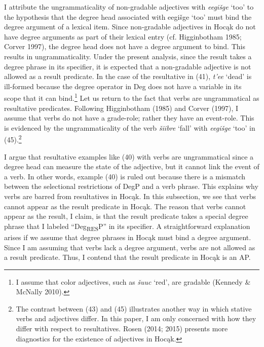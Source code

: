 \documentclass[output=paper]{LSP/langsci}
\begin{document}
I attribute the ungrammaticality of non-gradable adjectives with \textit{eegi\v{s}ge} `too' to the hypothesis that the degree head associated with eegi\v{s}ge `too' must bind the degree argument of a lexical item. Since non-gradable adjectives in Hoc\k{a}k do not have degree arguments as part of their lexical entry (cf. Higginbotham 1985; Corver 1997), the degree head does not have a degree argument to bind. This results in ungrammaticality. Under the present analysis, since the result takes a degree phrase in its specifier, it is expected that a non-gradable adjective is not allowed as a result predicate. In the case of the resultative in (41), \textit{t'ee} `dead' is ill-formed because the degree operator in Deg does not have a variable in its scope that it can bind.\footnote{I assume that color adjectives, such as \textit{\v{s}uuc} `red', are gradable (Kennedy \& McNally 2010).} Let us return to the fact that verbs are ungrammatical as resultative predicates. Following Higginbotham (1985) and Corver (1997), I assume that verbs do not have a grade-role; rather they have an event-role. This is evidenced by the ungrammaticality of the verb \textit{\v{s}iibre} `fall' with \textit{eegi\v{s}ge} `too' in (45).\footnote{The contrast between (43) and (45) illustrates another way in which stative verbs and adjectives differ. In this paper, I am only concerned with how they differ with respect to resultatives. Rosen (2014; 2015) presents more diagnostics for the existence of adjectives in Hoc\k{a}k.}

\begin{exe}


\end{exe}

I argue that resultative examples like (40) with verbs are ungrammatical since a degree head can measure the state of the adjective, but it cannot link the event of a verb. In other words, example (40) is ruled out because there is a mismatch between the selectional restrictions of DegP and a verb phrase. This explains why verbs are barred from resultatives in Hoc\k{a}k. In this subsection, we see that verbs cannot appear as the result predicate in Hoc\k{a}k. The reason that verbs cannot appear as the result, I claim, is that the result predicate takes a special degree phrase that I labeled ``Deg\textsubscript{RES}P'' in its specifier. A straightforward explanation arises if we assume that degree phrases in Hoc\k{a}k must bind a degree argument. Since I am assuming that verbs lack a degree argument, verbs are not allowed as a result predicate. Thus, I contend that the result predicate in Hoc\k{a}k is an AP.
\end{document}
